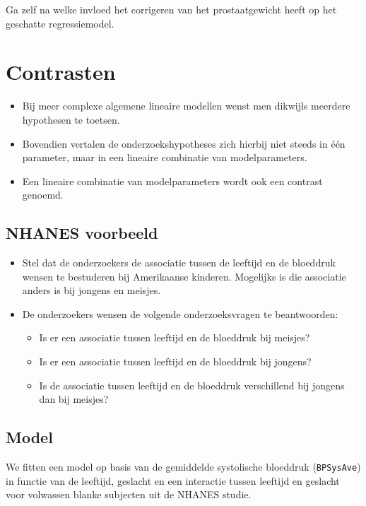 \documentclass[
  12pt,dutch]{book}
\providecommand{\tightlist}{%
  \setlength{\itemsep}{0pt}\setlength{\parskip}{0pt}}
\theoremstyle{definition}
\theoremstyle{definition}
\theoremstyle{definition}
\theoremstyle{definition}
\theoremstyle{remark}
\begin{document}
Ga zelf na welke invloed het corrigeren van het prostaatgewicht heeft op het geschatte regressiemodel.

\section{Contrasten}\label{contrasten}

\begin{itemize}
\tightlist
\item
  Bij meer complexe algemene lineaire modellen wenst men dikwijls meerdere hypothesen te toetsen.
\item
  Bovendien vertalen de onderzoekshypotheses zich hierbij niet steeds in één parameter, maar in een lineaire combinatie van modelparameters.
\item
  Een lineaire combinatie van modelparameters wordt ook een contrast genoemd.
\end{itemize}

\subsection{NHANES voorbeeld}\label{nhanes-voorbeeld-1}

\begin{itemize}
\item
  Stel dat de onderzoekers de associatie tussen de leeftijd en de bloeddruk wensen te bestuderen bij Amerikaanse kinderen. Mogelijks is die associatie anders is bij jongens en meisjes.
\item
  De onderzoekers wensen de volgende onderzoeksvragen te beantwoorden:

  \begin{itemize}
  \tightlist
  \item
    Is er een associatie tussen leeftijd en de bloeddruk bij meisjes?
  \item
    Is er een associatie tussen leeftijd en de bloeddruk bij jongens?
  \item
    Is de associatie tussen leeftijd en de bloeddruk verschillend bij jongens dan bij meisjes?
  \end{itemize}
\end{itemize}

\subsection{Model}\label{model-3}

We fitten een model op basis van de gemiddelde systolische bloeddruk (\texttt{BPSysAve}) in functie van de leeftijd, geslacht en een interactie tussen leeftijd en geslacht voor volwassen blanke subjecten uit de NHANES studie.
\end{document}
